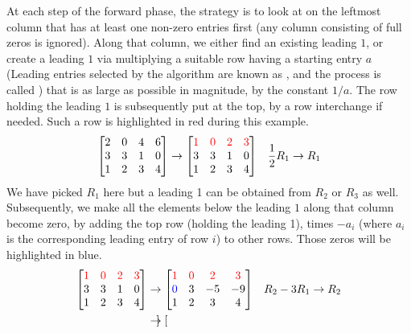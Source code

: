 \begin{solution}
At each step of the forward phase, the strategy is to look at on the leftmost column that has at least one non-zero entries first (any column consisting of full zeros is ignored). Along that column, we either find an existing leading $1$, or create a leading $1$ via multiplying a suitable row having a starting entry $a$ (Leading entries selected by the algorithm are known as , and the process is called ) that is as large as possible in magnitude, by the constant $1/a$. The row holding the leading $1$ is subsequently put at the top, by a row interchange if needed. Such a row is highlighted in red during this example.
\begin{align*}
\begin{bmatrix}
2 & 0 & 4 & 6 \\
3 & 3 & 1 & 0 \\
1 & 2 & 3 & 4
\end{bmatrix}
&\to
\begin{bmatrix}
\textcolor{red}{1} & \textcolor{red}{0} & \textcolor{red}{2} & \textcolor{red}{3} \\
3 & 3 & 1 & 0 \\
1 & 2 & 3 & 4
\end{bmatrix}
& \frac{1}{2}R_1 \to R_1
\end{align*}
We have picked $R_1$ here but a leading 1 can be obtained from $R_2$ or $R_3$ as well. Subsequently, we make all the elements below the leading $1$ along that column become zero, by adding the top row (holding the leading 1), times $-a_i$ (where $a_i$ is the corresponding leading entry of row $i$) to other rows. Those zeros will be highlighted in blue.
\begin{align*}
\begin{bmatrix}
\textcolor{red}{1} & \textcolor{red}{0} & \textcolor{red}{2} & \textcolor{red}{3} \\
3 & 3 & 1 & 0 \\
1 & 2 & 3 & 4
\end{bmatrix}
&\to
\begin{bmatrix}
\textcolor{red}{1} & \textcolor{red}{0} & \textcolor{red}{2} & \textcolor{red}{3} \\
\textcolor{blue}{0} & 3 & -5 & -9 \\
1 & 2 & 3 & 4
\end{bmatrix}
& R_2-3R_1 \to R_2 \\
&\to
\begin{bmatrix}

\end{bmatrix}
\end{align*}
\end{solution}
